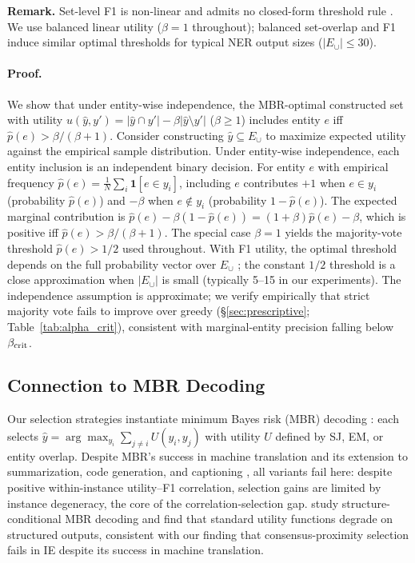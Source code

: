 \noindent\textbf{Remark.}
Set-level F1 is non-linear and admits no closed-form threshold rule \cite{dembczynski2011exact}. We use balanced linear utility ($\beta{=}1$ throughout); balanced set-overlap and F1 induce similar optimal thresholds for typical NER output sizes ($|E_\cup| \leq 30$).

\paragraph{Proof.}
We show that under entity-wise independence, the MBR-optimal constructed set with utility $u(\hat{y}, y') = |\hat{y} \cap y'| - \beta|\hat{y} \setminus y'|$ ($\beta \geq 1$) includes entity $e$ iff $\hat{p}(e) > \beta/(\beta+1)$.
Consider constructing $\hat{y} \subseteq E_\cup$ to maximize expected utility against the empirical sample distribution.
Under entity-wise independence, each entity inclusion is an independent binary decision.
For entity $e$ with empirical frequency $\hat{p}(e) = \frac{1}{N} \sum_i \mathbf{1}[e \in y_i]$, including $e$ contributes $+1$ when $e \in y_i$ (probability $\hat{p}(e)$) and $-\beta$ when $e \notin y_i$ (probability $1{-}\hat{p}(e)$).
The expected marginal contribution is $\hat{p}(e) - \beta(1{-}\hat{p}(e)) = (1{+}\beta)\hat{p}(e) - \beta$, which is positive iff $\hat{p}(e) > \beta/(\beta+1)$.
The special case $\beta{=}1$ yields the majority-vote threshold $\hat{p}(e) > 1/2$ used throughout.
With F1 utility, the optimal threshold depends on the full probability vector over $E_\cup$ \cite{dembczynski2011exact}; the constant $1/2$ threshold is a close approximation when $|E_\cup|$ is small (typically 5--15 in our experiments).
The independence assumption is approximate; we verify empirically that strict majority vote fails to improve over greedy (\S\ref{sec:prescriptive}; Table~\ref{tab:alpha_crit}), consistent with marginal-entity precision falling below $\beta_{\textup{crit}}$.

\subsection{Connection to MBR Decoding}\label{app:mbr_connection}

Our selection strategies instantiate minimum Bayes risk (MBR) decoding \cite{eikema2022sampling, muller2021understanding}: each selects $\hat{y} = \arg\max_{y_i} \sum_{j \neq i} U(y_i, y_j)$ with utility $U$ defined by SJ, EM, or entity overlap.
Despite MBR's success in machine translation \cite{freitag2022high} and its extension to summarization, code generation, and captioning \cite{jinnai2024mbr}, all variants fail here: despite positive within-instance utility--F1 correlation, selection gains are limited by instance degeneracy, the core of the correlation-selection gap.
\citet{eikema2025structured} study structure-conditional MBR decoding and find that standard utility functions degrade on structured outputs, consistent with our finding that consensus-proximity selection fails in IE despite its success in machine translation.

